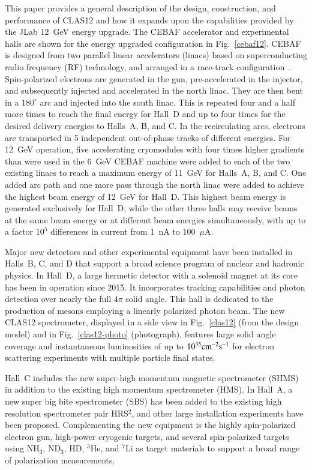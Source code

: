 \documentclass[final,3p,twocolumn]{elsarticle}
\begin{document}
This paper provides a general description of the design, construction, and performance of CLAS12 and how it expands
upon the capabilities provided by the JLab 12~GeV energy upgrade. The CEBAF accelerator and experimental halls
are shown for the energy upgraded configuration in Fig.~\ref{cebaf12}. CEBAF is designed from two parallel linear
accelerators (linacs) based on superconducting radio frequency (RF) technology, and arranged in a race-track
configuration~\cite{Leemann:2001dg}. Spin-polarized electrons are generated in the gun, pre-accelerated in the
injector, and subsequently injected and accelerated in the north linac. They are then bent in a $180^\circ$ arc and
injected into the south linac. This is repeated four and a half more times to reach the final energy for Hall~D and up to
four times  for the desired delivery energies to Halls~A, B, and C. In the recirculating arcs, electrons are transported
in 5 independent out-of-phase tracks of different energies. For 12~GeV operation, five accelerating cryomodules with
four times higher gradients than were used in the 6~GeV CEBAF machine were added to each of the two existing linacs
to reach a maximum energy of 11~GeV for Halls~A, B, and C. One added arc path and one more pass through the north
linac were added to achieve the highest beam energy of 12~GeV for Hall~D. This highest beam energy is generated
exclusively for Hall~D, while the other three halls may receive beams at the same beam energy or at different beam
energies simultaneously, with up to a factor $10^5$ differences in current from 1~nA to 100~$\mu$A.

Major new detectors and other experimental equipment have been installed in Halls~B, C, and D that support a broad
science program of nuclear and hadronic physics. In Hall~D, a large hermetic detector with a solenoid magnet at its core
has been in operation since 2015. It incorporates tracking capabilities and photon detection over nearly the full $4\pi$
solid angle. This hall is dedicated to the production of mesons employing a linearly polarized photon beam. The new
CLAS12 spectrometer, displayed in a side view in Fig.~\ref{clas12} (from the design model) and in Fig.~\ref{clas12-photo}
(photograph), features large solid angle coverage and instantaneous luminosities of up to $\rm {10^{35}cm^{-2}s^{-1}}$ for
electron scattering experiments with multiple particle final states. 

Hall~C includes the new super-high momentum magnetic spectrometer (SHMS) in addition to the existing high momentum
spectrometer (HMS). In Hall~A, a new super big bite spectrometer (SBS) has been added to the existing high resolution 
spectrometer pair HRS$^2$, and other large installation experiments have been proposed. Complementing the new
equipment is the highly spin-polarized electron gun, high-power cryogenic targets, and several spin-polarized targets using
NH$_3$, ND$_3$, HD, $^3$He, and $^7$Li as target materials to support a broad range of polarization measurements.   
\end{document}
